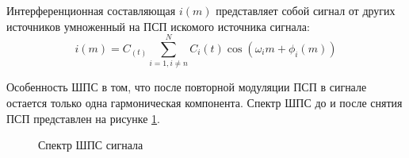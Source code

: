 Интерференционная составляющая ${i(m)}$ представляет собой сигнал от других источников умноженный на ПСП искомого источника сигнала:
\begin{equation}
	\label{eq:cdma_interference}
	i(m) = C_(t) \sum\limits_{i=1, i \ne n}^{N}C_i(t)\cos{(\omega_{i}m + \phi_i(m))}
\end{equation}

Особенность ШПС в том, что после повторной модуляции ПСП в сигнале остается только одна гармоническая компонента.
Спектр ШПС до и после снятия ПСП представлен на рисунке \ref{pic:gps_spectrum}.

\begin{figure}[H]
	\center{}
	\caption{Спектр ШПС сигнала}
	\label{pic:gps_spectrum}
\end{figure}
